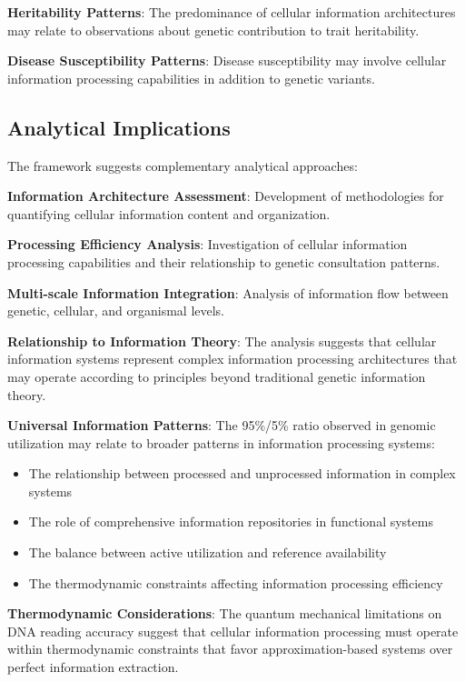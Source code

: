 \documentclass[12pt,a4paper]{article}
\begin{document}
\textbf{Heritability Patterns}: The predominance of cellular information architectures may relate to observations about genetic contribution to trait heritability.

\textbf{Disease Susceptibility Patterns}: Disease susceptibility may involve cellular information processing capabilities in addition to genetic variants.

\subsection{Analytical Implications}

The framework suggests complementary analytical approaches:

\textbf{Information Architecture Assessment}: Development of methodologies for quantifying cellular information content and organization.

\textbf{Processing Efficiency Analysis}: Investigation of cellular information processing capabilities and their relationship to genetic consultation patterns.

\textbf{Multi-scale Information Integration}: Analysis of information flow between genetic, cellular, and organismal levels.

\textbf{Relationship to Information Theory}: The analysis suggests that cellular information systems represent complex information processing architectures that may operate according to principles beyond traditional genetic information theory.

\textbf{Universal Information Patterns}: The 95\%/5\% ratio observed in genomic utilization may relate to broader patterns in information processing systems:

\begin{itemize}
\item The relationship between processed and unprocessed information in complex systems
\item The role of comprehensive information repositories in functional systems
\item The balance between active utilization and reference availability
\item The thermodynamic constraints affecting information processing efficiency
\end{itemize}

\textbf{Thermodynamic Considerations}: The quantum mechanical limitations on DNA reading accuracy suggest that cellular information processing must operate within thermodynamic constraints that favor approximation-based systems over perfect information extraction.
\end{document}
